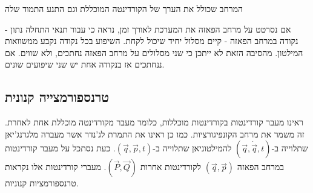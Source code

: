 \documentclass{tstextbook}
\begin{document}
\begin{definition}
המרחב שכולל את הערך של הקורדינטה המוכללת וגם התנע התמוד שלה

\end{definition}
אם נסרטט על מרחב הפאזה את המערכת לאורך זמן, נראה כי עבור תנאי התחלה נתון - נקודה במרחב הפאזה - קיים מסלול יחיד שיכול לקחת. השיפוע בכל נקודה נקבע ממשוואות המילטון. מהסיבה הזאת לא ייתכן כי שני מסלולים על מרחב הפאזה נחתכים, ולא שווים. אם ננחתכים אז בנקודה אחת יש שני שיפועים שונים.

\subsection{טרנספורמצייה קנונית}

ראינו מעבר קורדינטות בקורדינטות מוכללות, כלומר מעבר מקורדינטה מוכללת אחת לאחרת. זה משמר את מרחב הקונפיגורציות. כמו כן ראינו את התמרת לג'נדר אשר מעברה מלגרנג'יאן שתלוייה ב-\(\left( \vec{q},\dot{\vec{q}},t \right)\) להמילטוניאן שתלוייה ב-\(\left( \vec{q},\vec{p},t \right)\). כעת נסתכל על מעבר קורדינטות במרחב הפאזה \(\left( \vec{q},\vec{p} \right)\) לקורדינטות אחרות \(\left( \vec{P},\vec{Q} \right)\). מעברי קורדינטות אלו נקראות טרנספורמציות קנוניות. 
\end{document}
